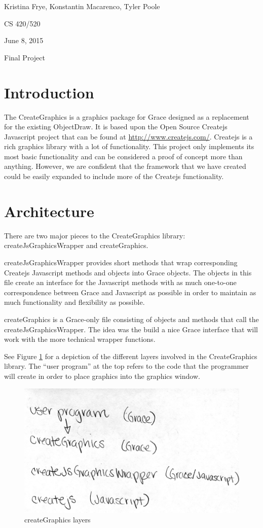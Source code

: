 \documentclass{article}
\begin{document}
{\raggedleft Kristina Frye, Konstantin Macarenco, Tyler Poole \par}
{\raggedleft CS 420/520 \par}
{\raggedleft June 8, 2015 \par}
{\raggedleft Final Project \par} 

\section {Introduction}
The CreateGraphics is a graphics package for Grace designed as a replacement for the 
existing ObjectDraw. It is based upon the Open Source Createjs Javascript project that can be found
at \url{http://www.createjs.com/}. Createjs is a rich graphics library with a lot of functionality. This
project only implements its most basic functionality and can be considered a proof of concept
more than anything. However, we are confident that the framework that we have created
could be easily expanded to include more of the Createjs functionality.

\section {Architecture}
There are two major pieces to the CreateGraphics library: createJsGraphicsWrapper and
createGraphics.

createJsGraphicsWrapper provides short methods that wrap corresponding Createjs Javascript
methods and objects into Grace objects. The objects in this file create an interface for
the Javascript methods with as much one-to-one correspondence between Grace and 
Javascript as possible in order to maintain as much functionality and flexibility as possible.

createGraphics is a Grace-only file consisting of objects and methods that call the
createJsGraphicsWrapper. The idea was the build a nice Grace interface that will 
work with the more technical wrapper functions.

See Figure \ref{fig:layers} for a depiction of the different layers involved in the CreateGraphics
library. The ``user program'' at the top refers to the code that the programmer will create
in order to place graphics into the graphics window.

\begin{figure}[h]
\includegraphics[scale=0.5]{layers}
\centering
\caption{createGraphics layers}
\label{fig:layers}
\end{figure}
\end{document}
